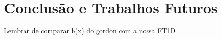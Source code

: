 
\chapter{Conclusão e Trabalhos Futuros}
\label{ch:conclusion}
	Lembrar de comparar b(x) do gordon com a nossa FT1D